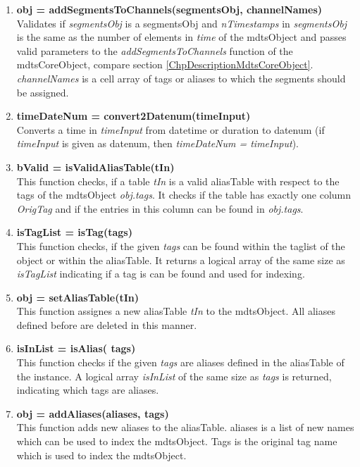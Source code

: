 \documentclass[a4]{scrreprt}
\begin{document}
\begin{enumerate}
\item \textbf{obj = addSegmentsToChannels(segmentsObj, channelNames)}\\
Validates if \textit{segmentsObj} is a segmentsObj and \textit{nTimestamps} in \textit{segmentsObj} is the same as the number of elements in \textit{time} of the mdtsObject and passes valid parameters to the \textit{addSegmentsToChannels} function of the mdtsCoreObject, compare section \ref{ChpDescriptionMdtsCoreObject}. \textit{channelNames} is a cell array of tags or aliases to which the segments should be assigned.

\item \textbf{timeDateNum = convert2Datenum(timeInput)}\\
Converts a time in \textit{timeInput} from datetime or duration to datenum (if \textit{timeInput} is given as datenum, then \textit{timeDateNum = timeInput}).

\item \textbf{bValid = isValidAliasTable(tIn)}\\
This function checks, if a table \textit{tIn} is a valid aliasTable with respect to the tags of the mdtsObject \textit{obj.tags}. It checks if the table has exactly one column \textit{OrigTag} and if the entries in this column can be found in \textit{obj.tags}.

\item \textbf{isTagList = isTag(tags)}\\
This function checks, if the given \textit{tags} can be found within the taglist of the object or within the aliasTable. It returns a logical array of the same size as \textit{isTagList} indicating if a tag is can be found and used for indexing.

\item \textbf{obj =  setAliasTable(tIn)}\\
This function assignes a new aliasTable \textit{tIn} to the mdtsObject. All aliases defined before are deleted in this manner.

\item \textbf{isInList = isAlias( tags)}\\
This function checks if the given \textit{tags} are aliases defined in the aliasTable of the instance. A logical array \textit{isInList} of the same size as \textit{tags} is returned, indicating which tags are aliases.

\item \textbf{obj = addAliases(aliases, tags)}\\
This function adds new aliases to the aliasTable. aliases is a list of new names which can be used to index the mdtsObject. Tags is the original tag name which is used to index the mdtsObject.


\end{enumerate}
\end{document}
